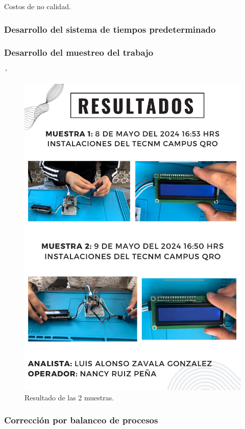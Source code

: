     Costos de no calidad.
    \subsubsection{Desarrollo del sistema de tiempos predeterminado}
    \subsubsection{Desarrollo del muestreo del trabajo}
    ´
    \begin{figure}[H]
        \centering
        \includegraphics[scale=0.4]{35/Img/reultadosEnsamble.pdf}
        \caption{Resultado de las 2 muestras.}
    \end{figure}
    \subsubsection{Corrección por balanceo de procesos}
